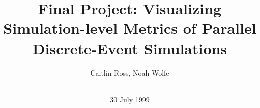 \documentclass{acm_proc_article-sp}
\begin{document}



\title{Final Project: Visualizing Simulation-level Metrics of Parallel Discrete-Event Simulations}
%
%
%
%
%

%
\author{
%
%
\alignauthor
Caitlin Ross, Noah Wolfe\\
       \\
}
\date{30 July 1999}
\end{document}
